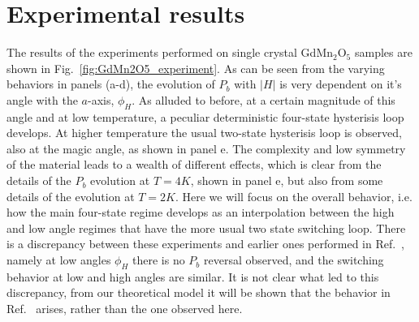 \section{Experimental results}
The results of the experiments performed on single crystal GdMn$_2$O$_5$ samples are shown in Fig.~\ref{fig:GdMn2O5_experiment}. As can be seen from the varying behaviors in panels (a-d), the evolution of $P_b$ with $|H|$ is very dependent on it's angle with the $a$-axis, $\phi_H$.
As alluded to before, at a certain magnitude of this angle and at low temperature, a peculiar deterministic four-state hysterisis loop develops. 
At higher temperature the usual two-state hysterisis loop is observed, also at the magic angle, as shown in panel e.
The complexity and low symmetry of the material leads to a wealth of different effects, which is clear from the details of the $P_b$ evolution at $T=4K$, shown in panel e, but also from some details of the evolution at $T=2K$.
Here we will focus on the overall behavior, i.e. how the main four-state regime develops as an interpolation between the high and low angle regimes that have the more usual two state switching loop.
There is a discrepancy between these experiments and earlier ones performed in Ref.~\cite{Lee13}, namely at low angles $\phi_H$ there is no $P_b$ reversal observed, and the switching behavior at low and high angles are similar.
It is not clear what led to this discrepancy, from our theoretical model it will be shown that the behavior in Ref.~\cite{Lee13} arises, rather than the one observed here.
\begin{figure*}[t]
    \centering
\caption{ \label{fig:GdMn2O5_experiment} {\bf Evolution of the electric polarization loop across critical angle  and critical temperature.} (a) At higher temperatures only a small step is seen at the transition that shows some hysteresis and the two-state switching; (b) 4-state switching starts to appear approximately from $T=5$~K.(c) four-state hysteresis loop is clearly seen at $T=2.3$~K with the magnetic field at the ``magic'' angle;  
(d-f) Field dependence of the electric polarization of GdMn$_2$O$_5$ for different off-axis orientations of the applied magnetic field. (d,f): Conventional two-state switching is observed if magnetic field is (d) far away from the ``magic" direction  or (f) very close to the crystallographic $a$-axis. (e,g): Unusual four-state hysteresis loop for the magnetic field direction close to the magic angle of $\pm 9^o$. The inset shows the sequence of the magnetic field-sweeps. The labels 1-4 mark the four polarization states. The arrows show the direction of magnetic field-change during the sweep. The experiments have been done at $T=2.3$\,K. }
\end{figure*}
